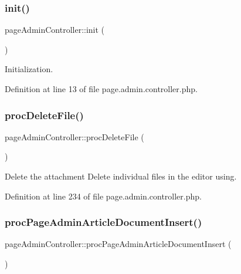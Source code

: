 \subsubsection{\texorpdfstring{init()}{init()}}
{\footnotesize\ttfamily page\+Admin\+Controller\+::init (\begin{DoxyParamCaption}{ }\end{DoxyParamCaption})}



Initialization. 



Definition at line 13 of file page.\+admin.\+controller.\+php.

\mbox{\label{classpageAdminController_a79f90d79016b9550455e80c2ab6f72d8}} 
\subsubsection{\texorpdfstring{proc\+Delete\+File()}{procDeleteFile()}}
{\footnotesize\ttfamily page\+Admin\+Controller\+::proc\+Delete\+File (\begin{DoxyParamCaption}{ }\end{DoxyParamCaption})}



Delete the attachment Delete individual files in the editor using. 



Definition at line 234 of file page.\+admin.\+controller.\+php.

\mbox{\label{classpageAdminController_a5ffba4fec0a2c2bd86b4c67fcaff61e8}} 
\subsubsection{\texorpdfstring{proc\+Page\+Admin\+Article\+Document\+Insert()}{procPageAdminArticleDocumentInsert()}}
{\footnotesize\ttfamily page\+Admin\+Controller\+::proc\+Page\+Admin\+Article\+Document\+Insert (\begin{DoxyParamCaption}{ }\end{DoxyParamCaption})}



